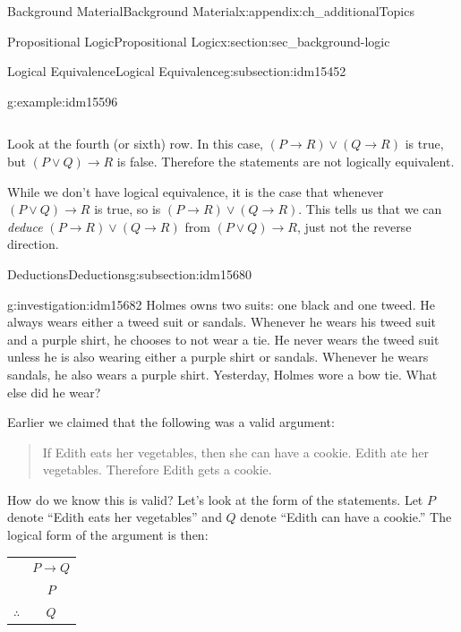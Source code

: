 \documentclass[oneside,10pt,]{book}
\numberwithin{equation}{chapter}
\newcommand{\hrulethin}  {\noalign{\hrule height 0.04em}}
\def\imp{\rightarrow}
\begin{document}
\begin{appendixptx}{Background Material}{}{Background Material}{}{}{x:appendix:ch_additionalTopics}
\begin{sectionptx}{Propositional Logic}{}{Propositional Logic}{}{}{x:section:sec_background-logic}
\begin{subsectionptx}{Logical Equivalence}{}{Logical Equivalence}{}{}{g:subsection:idm15452}
\begin{example}{}{g:example:idm15596}
\begin{sidebyside}{1}{0}{0}{0}
\begin{sbspanel}{1}
{\begin{tabular}{cAcAcBcAc}
\end{tabular}
\par}
\end{sbspanel}%
\end{sidebyside}%
\par
Look at the fourth (or sixth) row. In this case, \((P \imp R) \vee (Q \imp R)\) is true, but \((P \vee Q) \imp R\) is false. Therefore the statements are not logically equivalent.%
\par
While we don't have logical equivalence, it is the case that whenever \((P \vee Q) \imp R\) is true, so is \((P \imp R) \vee (Q \imp R)\).  This tells us that we can \emph{deduce} \((P \imp R) \vee (Q \imp R)\) from \((P \vee Q) \imp R\), just not the reverse direction.%
\end{example}
\end{subsectionptx}
%
%
\typeout{************************************************}
\typeout{************************************************}
%
\begin{subsectionptx}{Deductions}{}{Deductions}{}{}{g:subsection:idm15680}
\begin{investigation}{}{g:investigation:idm15682}%
Holmes owns two suits: one black and one tweed. He always wears either a tweed suit or sandals. Whenever he wears his tweed suit and a purple shirt, he chooses to not wear a tie. He never wears the tweed suit unless he is also wearing either a purple shirt or sandals. Whenever he wears sandals, he also wears a purple shirt. Yesterday, Holmes wore a bow tie. What else did he wear?%
\end{investigation}
Earlier we claimed that the following was a valid argument:%
\begin{quote}%
If Edith eats her vegetables, then she can have a cookie. Edith ate her vegetables. Therefore Edith gets a cookie.%
\end{quote}
How do we know this is valid? Let's look at the form of the statements. Let \(P\) denote ``Edith eats her vegetables'' and \(Q\) denote ``Edith can have a cookie.'' The logical form of the argument is then:%
\begin{sidebyside}{1}{0}{0}{0}%
\begin{sbspanel}{1}%
{\centering%
\begin{tabular}{cc}
&\(P \imp Q\)\tabularnewline[0pt]
&\(P\)\tabularnewline\hrulethin
\(\therefore\)&\(Q\)
\end{tabular}
\par}
\end{sbspanel}%

\end{sidebyside}
\end{subsectionptx}
\end{sectionptx}
\end{appendixptx}
\end{document}
